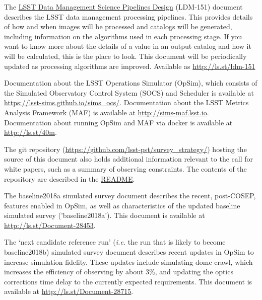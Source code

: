 \documentclass[DM,toc,usenatbib]{lsstdoc}
\begin{document}
The \href{http://ls.st/ldm-151}{LSST Data Management Science Pipelines Design} (LDM-151) document describes the LSST data management processing pipelines. This provides details of how and when images will be processed and catalogs will be generated, including information on the algorithms used in each processing stage. If you want to know more about the details of a value in an output catalog and how it will be calculated, this is the place to look. This document will be periodically updated as processing algorithms are improved. Available as \url{http://ls.st/ldm-151}


Documentation about the LSST Operations Simulator (OpSim), which consists of the Simulated Observatory Control System (SOCS) and 
Scheduler is available at \url{https://lsst-sims.github.io/sims_ocs/}.   
Documentation about the LSST Metrics Analysis Framework (MAF) is available at \url{http://sims-maf.lsst.io}.  Documentation about running
OpSim and MAF via docker is available at \url{http://ls.st/40m}.

The git repository (\href{https://github.com/lsst-pst/survey_strategy/}{https://github.com/lsst-pst/survey\_strategy/}) hosting the source of this document also holds additional information relevant to the call for white papers, such as a summary of observing constraints. The contents of the repository are described in the \href{https://github.com/lsst-pst/survey_strategy/blob/master/README.md}{README}. 

The baseline2018a simulated survey document describes the recent, post-COSEP, features enabled in OpSim, as well 
as characteristics of the updated baseline simulated survey ('baseline2018a'). This document is available at \url{http://ls.st/Document-28453}.

The `next candidate reference run' ({\it i.e.} the run that is likely to become baseline2018b) simulated survey document describes 
recent updates in OpSim to increase simulation fidelity. These updates include simulating dome crawl, which increases the efficiency 
of observing by about 3\%, and updating the optics corrections time delay to the currently expected requirements. This document is available at 
\url{http://ls.st/Document-28715}.
\end{document}
